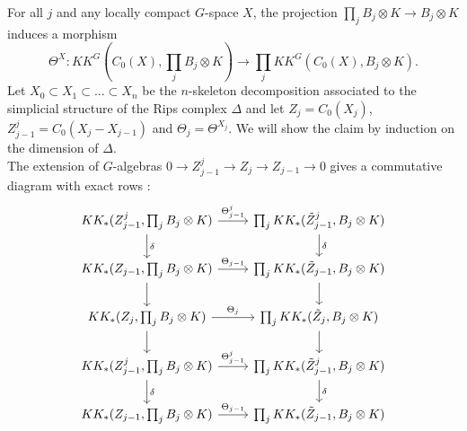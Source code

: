 \begin{dem}
For all $j$ and any locally compact $G$-space $X$, the projection $\prod_j B_j\otimes K\rightarrow B_j \otimes K$ induces a morphism
\[\Theta^X : KK^G(C_0(X),\prod_j B_j\otimes K )\rightarrow \prod_j  KK^G(C_0(X),B_j\otimes K ).\]
Let $X_0\subset X_1 \subset ...\subset X_n$ be the $n$-skeleton decomposition associated to the simplicial structure of the Rips complex $\Delta$ and let $Z_j = C_0(X_j)$, $Z^j_{j-1} = C_0(X_j-X_{j-1})$ and $\Theta_j = \Theta^{X_j}$.
We will show the claim by induction on the dimension of $\Delta$.\\

The extension of $G$-algebras $0\rightarrow Z^j_{j-1} \rightarrow Z_j \rightarrow Z_{j-1}\rightarrow 0$ gives a commutative diagram with exact rows :
\[\begin{tikzcd}
KK_*(Z^j_{j-1},\prod_j B_j\otimes K)\arrow{d}{\delta}\arrow{r}{\Theta^j_{j-1}} & \prod_j KK_*(\tilde Z^j_{j-1},B_j \otimes K)\arrow{d}{\delta} \\
KK_*(Z_{j-1},\prod_j B_j\otimes K)\arrow{d}\arrow{r}{\Theta_{j-1}}  &  \prod_j KK_*(\tilde Z_{j-1},B_j \otimes K)\arrow{d} \\
KK_*(Z_j,\prod_j B_j\otimes K)\arrow{d}\arrow{r}{\Theta_j} & \prod_j KK_*(\tilde Z_j,B_j \otimes K)\arrow{d} \\
KK_*(Z^j_{j-1},\prod_j B_j\otimes K)\arrow{d}{\delta} \arrow{r}{\Theta^j_{j-1}} & \prod_j KK_*(\tilde Z^j_{j-1},B_j \otimes K)\arrow{d}{\delta}\\
KK_*(Z_{j-1},\prod_j B_j\otimes K)\arrow{r}{\Theta_{j-1}} & \prod_j KK_*(\tilde Z_{j-1},B_j \otimes K)
\end{tikzcd}\]


\end{dem}
